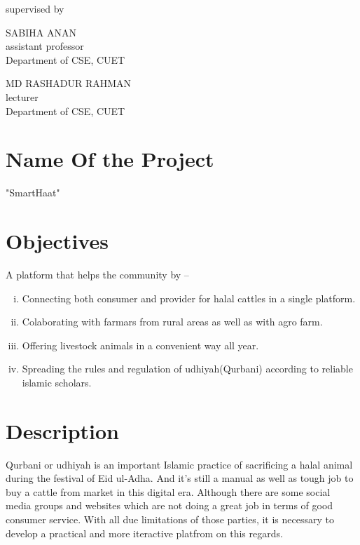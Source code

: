 \documentclass[a4paper,12pt]{report}
\begin{document}
\begin{titlepage}
	\vspace{0.5cm}
	supervised by

	\parbox[l]{8cm}{\begin{center}

			SABIHA ANAN\\
			\footnotesize{assistant professor\\
				Department of CSE, CUET}
		\end{center}
	}
	\parbox[r]{8cm}{\begin{center}

			MD RASHADUR RAHMAN\\
			\footnotesize{lecturer \\
				Department of CSE, CUET}
		\end{center}
	}

	\vfill
\end{titlepage}


\onehalfspacing

\section*{Name Of the Project}
"SmartHaat"
\section*{Objectives}
A platform that helps the community by --
\begin{enumerate}[i.]
\item Connecting both consumer and provider for halal cattles in a single platform.
\item Colaborating with farmars from rural areas as well as with agro farm.
\item Offering livestock animals in a convenient way all year.
\item Spreading the rules and regulation of udhiyah(Qurbani) according to reliable islamic scholars.
\end{enumerate}
\section*{Description}
Qurbani or udhiyah is an important Islamic practice of sacrificing a halal animal during the festival of Eid ul-Adha. And it's still a manual as well as tough job to buy a cattle from market in this digital era. Although there are some social media groups and websites which are not doing a great job in terms of good consumer service. With all due limitations of those parties, it is necessary to develop a practical and more iteractive platfrom on this regards.
\end{document}
